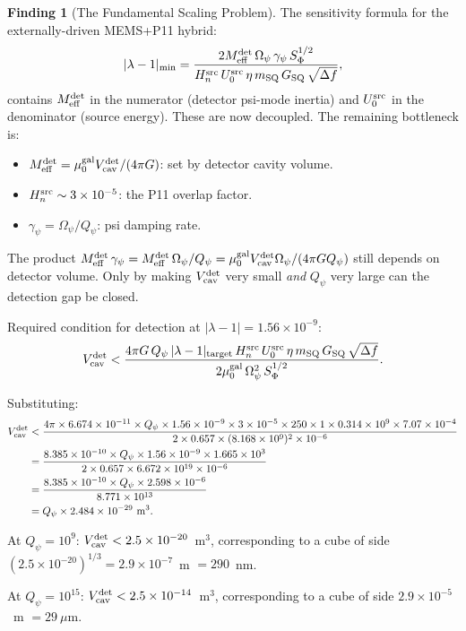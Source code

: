 \documentclass[11pt,twocolumn]{article}
\newcommand{\lam}{\lambda}
\newcommand{\Opsi}{\Omega_\psi}
\newcommand{\gpsi}{\gamma_\psi}
\newcommand{\Meff}{M_{\rm eff}}
\newcommand{\ee}[1]{\times 10^{#1}}
\newcommand{\Qpsi}{Q_\psi}
\newcommand{\Heff}{H_n}
\newcommand{\Vcav}{V_{\rm cav}}
\newcommand{\muG}{\mu_0^{\rm gal}}
\theoremstyle{definition}
\newtheorem{finding}[theorem]{Finding}
\theoremstyle{remark}
\begin{document}
\begin{finding}[The Fundamental Scaling Problem]
\label{find:scaling_problem}
The sensitivity formula for the externally-driven MEMS+P11 hybrid:
\begin{equation}
|\lam-1|_{\rm min} = \frac{2\Meff^{\rm det}\,\Opsi\,\gpsi\,S_\Phi^{1/2}}
{\Heff^{\rm src}\,U_0^{\rm src}\,\eta\,m_{\rm SQ}\,G_{\rm SQ}\,\sqrt{\Delta f}},
\label{eq:general_sensitivity}
\end{equation}
contains $\Meff^{\rm det}$ in the numerator (detector psi-mode inertia)
and $U_0^{\rm src}$ in the denominator (source energy). These are now
decoupled. The remaining bottleneck is:
\begin{itemize}[nosep]
\item $\Meff^{\rm det} = \muG\Vcav^{\rm det}/(4\pi G)$: set by detector
  cavity volume.
\item $\Heff^{\rm src} \sim 3\ee{-5}$: the P11 overlap factor.
\item $\gpsi = \Opsi/\Qpsi$: psi damping rate.
\end{itemize}

The product $\Meff^{\rm det}\,\gpsi = \Meff^{\rm det}\,\Opsi/\Qpsi
= \muG\Vcav^{\rm det}\Opsi/(4\pi G\Qpsi)$ still depends on detector
volume. Only by making $\Vcav^{\rm det}$ very small \emph{and} $\Qpsi$
very large can the detection gap be closed.

Required condition for detection at $|\lam-1| = 1.56\ee{-9}$:
\begin{equation}
\Vcav^{\rm det} < \frac{4\pi G\,\Qpsi\,|\lam-1|_{\rm target}
\,\Heff^{\rm src}\,U_0^{\rm src}\,\eta\,m_{\rm SQ}\,G_{\rm SQ}\,\sqrt{\Delta f}}
{2\muG\,\Opsi^2\,S_\Phi^{1/2}}.
\label{eq:Vcav_required}
\end{equation}

Substituting:
\begin{align}
\Vcav^{\rm det} &< \frac{4\pi\times 6.674\ee{-11}\times\Qpsi\times 1.56\ee{-9}
\times 3\ee{-5}\times 250\times 1\times 0.314\times 10^9\times 7.07\ee{-4}}
{2\times 0.657\times(8.168\ee{9})^2\times 10^{-6}}
\nonumber\\
&= \frac{8.385\ee{-10}\times\Qpsi\times 1.56\ee{-9}\times 1.665\ee{3}}
{2\times 0.657\times 6.672\ee{19}\times 10^{-6}}
\nonumber\\
&= \frac{8.385\ee{-10}\times\Qpsi\times 2.598\ee{-6}}
{8.771\ee{13}}
\nonumber\\
&= \Qpsi\times 2.484\ee{-29}~\text{m}^3.
\label{eq:Vcav_required_num}
\end{align}

At $\Qpsi = 10^9$: $\Vcav^{\rm det} < 2.5\ee{-20}$~m$^3$, corresponding to a
cube of side $(2.5\ee{-20})^{1/3} = 2.9\ee{-7}$~m $= 290$~nm.

At $\Qpsi = 10^{15}$: $\Vcav^{\rm det} < 2.5\ee{-14}$~m$^3$, corresponding to
a cube of side $2.9\ee{-5}$~m $= 29~\mu$m.
\end{finding}
\end{document}
